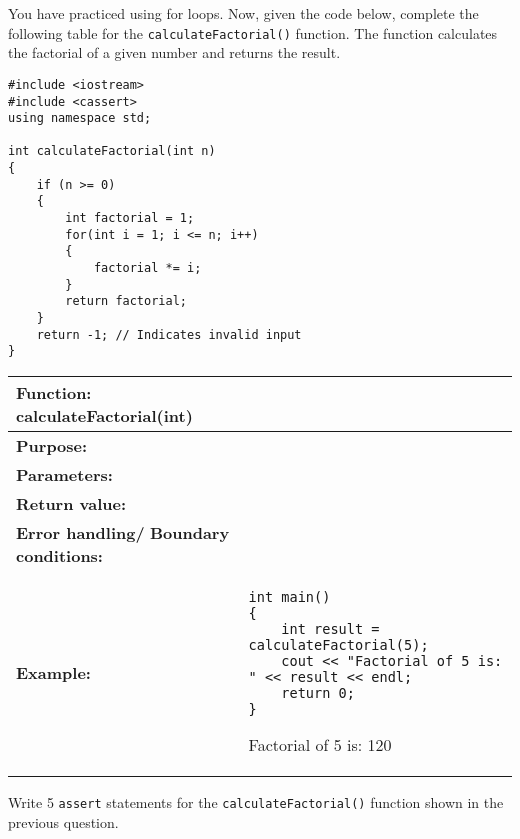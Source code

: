 \begin{problem}
    You have practiced using for loops. Now, given the code below, complete the following table for the \texttt{calculateFactorial()} function. The function calculates the factorial of a given number and returns the result.
    
\begin{verbatim}
#include <iostream>
#include <cassert>
using namespace std;

int calculateFactorial(int n)
{
    if (n >= 0)
    {
        int factorial = 1;
        for(int i = 1; i <= n; i++)
        {
            factorial *= i;
        }
        return factorial;
    }
    return -1; // Indicates invalid input
}
\end{verbatim}
    
\newpage
    
\begin{longtable}[H]{|p{1.7in}|p{4.0in}|} \hline
    \textbf{Function:} \newline 
    calculateFactorial(int) & \\ \hline
    \textbf{Purpose:}  & \\ \hline
    \textbf{Parameters:} &   \\ \hline
    \textbf{Return value:} & \\ \hline
    \textbf{Error handling/} \newline
    \textbf{Boundary conditions:} & \\ \hline
    \textbf{Example:} & 
    \begin{verbatim}    
int main()
{
    int result = calculateFactorial(5);
    cout << "Factorial of 5 is: " << result << endl;
    return 0;
}
    \end{verbatim}
    
    \begin{sample}
    Factorial of 5 is: 120
    \end{sample}
             \\ \hline
    \end{longtable}
\end{problem}

\begin{problem}
    Write 5 \texttt{assert} statements for the \texttt{calculateFactorial()} function shown in the previous question.
\end{problem}


